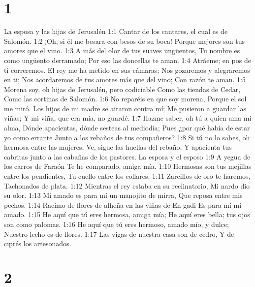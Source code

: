 
\chapter{1}

La esposa y las hijas de Jerusalén  
1:1 Cantar de los cantares, el cual es de Salomón. 
1:2 ¡Oh, si él me besara con besos de su boca!  
Porque mejores son tus amores que el vino.  
1:3 A más del olor de tus suaves ungüentos,  
Tu nombre es como ungüento derramado;  
Por eso las doncellas te aman.  
1:4 Atráeme; en pos de ti correremos.  
El rey me ha metido en sus cámaras;  
Nos gozaremos y alegraremos en ti;  
Nos acordaremos de tus amores más que del vino;  
Con razón te aman.  
1:5 Morena soy, oh hijas de Jerusalén, pero codiciable  
Como las tiendas de Cedar,  
Como las cortinas de Salomón.  
1:6 No reparéis en que soy morena,  
Porque el sol me miró.  
Los hijos de mi madre se airaron contra mí;  
Me pusieron a guardar las viñas;  
Y mi viña, que era mía, no guardé.  
1:7 Hazme saber, oh tú a quien ama mi alma,  
Dónde apacientas, dónde sesteas al mediodía;  
Pues ¿por qué había de estar yo como errante  
Junto a los rebaños de tus compañeros?  
1:8 Si tú no lo sabes, oh hermosa entre las mujeres,  
Ve, sigue las huellas del rebaño,  
Y apacienta tus cabritas junto a las cabañas de los pastores. 
La esposa y el esposo  
1:9 A yegua de los carros de Faraón  
Te he comparado, amiga mía.  
1:10 Hermosas son tus mejillas entre los pendientes,  
Tu cuello entre los collares.  
1:11 Zarcillos de oro te haremos,  
Tachonados de plata.  
1:12 Mientras el rey estaba en su reclinatorio,  
Mi nardo dio su olor.  
1:13 Mi amado es para mí un manojito de mirra,  
Que reposa entre mis pechos.  
1:14 Racimo de flores de alheña en las viñas de En-gadi  
Es para mí mi amado.  
1:15 He aquí que tú eres hermosa, amiga mía; 
He aquí eres bella; tus ojos son como palomas.  
1:16 He aquí que tú eres hermoso, amado mío, y dulce;  
Nuestro lecho es de flores.  
1:17 Las vigas de nuestra casa son de cedro,  
Y de ciprés los artesonados.  

\chapter{2}


